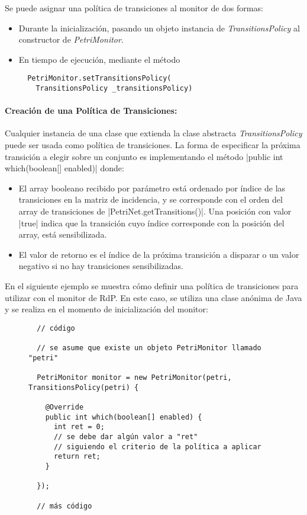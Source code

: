 Se puede asignar una política de transiciones al monitor de dos formas:

\begin{itemize}
    \item Durante la inicialización, pasando un objeto instancia de
    \textit{TransitionsPolicy} al constructor de \textit{PetriMonitor}.
    \item En tiempo de ejecución, mediante el método\\ {
    \begin{verbatim}
  PetriMonitor.setTransitionsPolicy(
    TransitionsPolicy _transitionsPolicy)
    \end{verbatim}
    }
\end{itemize}

\paragraph{Creación de una Política de Transiciones:}
Cualquier instancia de una clase que extienda la clase abstracta
\textit{TransitionsPolicy} puede ser usada como política de transiciones.
La forma de especificar la próxima transición a elegir sobre un conjunto es
implementando el método |public int which(boolean[] enabled)| donde:
\begin{itemize}
    \item El array booleano recibido por parámetro está ordenado por índice de
    las transiciones en la matriz de incidencia, y se corresponde con el orden
    del array de transiciones de |PetriNet.getTransitions()|. Una
    posición con valor |true| indica que la transición cuyo índice
    corresponde con la posición del array, está sensibilizada.
    \item El valor de retorno es el índice de la próxima transición a disparar
    o un valor negativo si no hay transiciones sensibilizadas.
\end{itemize}

En el siguiente ejemplo se muestra cómo definir una política de transiciones
para utilizar con el monitor de RdP. En este caso, se utiliza una clase anónima
de Java y se realiza en el momento de inicialización del monitor:

\begin{figure}[H]
\centering
\begin{verbatim}
  // código
  
  // se asume que existe un objeto PetriMonitor llamado "petri"
  
  PetriMonitor monitor = new PetriMonitor(petri, TransitionsPolicy(petri) {

    @Override
    public int which(boolean[] enabled) {
      int ret = 0;
      // se debe dar algún valor a "ret"
      // siguiendo el criterio de la política a aplicar
      return ret;
    }

  });
  
  // más código
\end{verbatim}
\end{figure}


